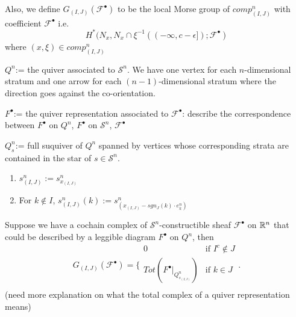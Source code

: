 Also, we define $G_{(I,J)}(\mathscr{F}^\bullet)$ to be the local Morse group of $comp^n_{(I,J)}$ with coefficient $\mathscr{F}^\bullet$ i.e.
\[
H^*(N_x,N_x\cap \xi^{-1}((-\infty,c-\epsilon]);\mathscr{F}^\bullet)
\]
where $(x,\xi)\in comp^n_{(I,J)}$
\begin{definition}
$Q^n$:= the quiver associated to $\mathcal{S}^n$. We have one vertex for each $n$-dimensional stratum and one arrow for each $(n-1)$-dimensional stratum where the direction goes against the co-orientation.
\end{definition}
\begin{definition}
$F^\bullet$:= the quiver representation associated to $\mathscr{F}^\bullet$: describe the correspondence between $F^\bullet$ on $Q^n$, $F^\bullet$ on $\mathcal{S}^n$, $\mathscr{F}^\bullet$
\end{definition}
\begin{definition}
$Q_s^n$:= full suquiver of $Q^n$ spanned by vertices whose corresponding strata are contained in the star of $s\in \mathcal{S}^n$.
\end{definition}
\begin{definition}
\begin{enumerate}
\item $s^n_{(I,J)}:= s^n_{x_{(I,J)}}$

\item For $k\not\in I$, $s^n_{(I,J)}(k):= s^n_{(x_{(I,J)} - sgn_J(k)\cdot e^n_k)}$ 
\end{enumerate}
\end{definition}
\begin{lemma}
Suppose we have a cochain complex of $\mathcal{S}^n$-constructible sheaf $\mathscr{F}^\bullet$ on $\mathbb{R}^n$ that could be described by a leggible diagram $F^\bullet$ on $Q^n$, then
\[G_{(I,J)}(\mathscr{F}^\bullet)=\bigg\{
\begin{array}{ll}
    0 & \text{if } I^c \not\in J \\
	Tot(F^\bullet|_{Q^n_{s_{(I,J)}}}) & \text{if } k\in J \\
\end{array}
\bigg.
\]
(need more explanation on what the total complex of a quiver representation means)
\end{lemma}
